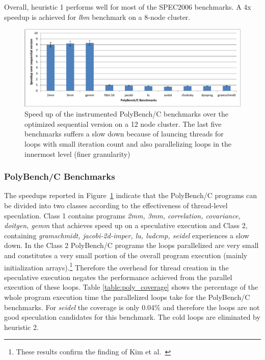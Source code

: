 \documentclass[10pt]{report}          %
\begin{document}
Overall, heuristic 1 performs well for most of the SPEC2006 benchmarks.  A 4x speedup is achieved for \textit{lbm} benchmark on a 8-node cluster. 

\begin{figure}[h]
\begin{center}
\includegraphics[scale =0.75]{./pdf/speedup_polybench.pdf}
\caption{Speed up of the instrumented PolyBench/C benchmarks over the optimized sequential version on a 12 node cluster. The last five benchmarks suffers a slow down because of launcing threads for loops with small iteration count and also parallelizing loops in the innermost level (finer granularity)}
\end{center}
\label{fig:speedup_polybench}
\end{figure}

\subsubsection{PolyBench/C Benchmarks}

The speedups reported in Figure~\ref{fig:speedup_polybench} indicate that the  PolyBench/C programs can be divided into two classes according to the effectiveness of thread-level speculation. Class 1 contains programs\textit{ 2mm, 3mm, correlation, covariance, doitgen, gemm} that achieves speed up on a speculative execution and Class 2, containing \textit{gramschmidt, jacobi-2d-imper, lu, ludcmp, seidel} experiences a slow down.  In the Class 2 PolyBench/C programs the loops parallelized are very small and constitutes a very small portion of the overall program execution (mainly initialization arrays).\footnote{These results confirm the finding of Kim et al.~\cite{KimCGO12}}  Therefore the overhead for thread creation in the speculative execution negates the performance achieved from the parallel execution of these loops. Table \ref{table:poly_coverage} shows the percentage of the whole program execution time the parallelized loops take for the PolyBench/C benchmarks. For \textit{seidel} the coverage is only 0.04\% and therefore the loops are not good speculation candidates for this benchmark.  The cold loops are eliminated by heuristic 2.
\end{document}
